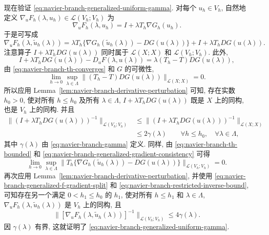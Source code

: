 \begin{Proof}
现在验证 \eqref{eq:navier-branch-generalized-uniform-gamma}.
对每个 $u_h\in V_h$, 自然地定义
$\nabla_uF_h(\lambda,u_h)\in\mathcal L(V_h;V_h)$ 为
\begin{equation}\label{eq:navier-branch-generalized-f-gradient}
\nabla_uF_h(\lambda,u_h)=I+\lambda T_h\nabla G_h(u_h).
\end{equation}
于是可写成
\begin{equation}\label{eq:navier-branch-generalized-f-gradient-split}
\nabla_uF_h(\lambda,\widetilde u_h(\lambda))
=\lambda T_h\{\nabla G_h(\widetilde u_h(\lambda))-DG(u(\lambda))\}
+I+\lambda T_hDG(u(\lambda)).
\end{equation}
注意算子 $I+\lambda T_hDG(u(\lambda))$ 同时属于
$\mathcal L(X;X)$ 和 $\mathcal L(V_h;V_h)$. 此外,
\[
I+\lambda T_hDG(u(\lambda))-D_uF(\lambda,u(\lambda))
=\lambda(T_h-T)DG(u(\lambda)),
\]
由 \eqref{eq:navier-branch-th-converges} 和 $G$ 的可微性,
\[
\lim_{h\to0}\sup_{\lambda\in\Lambda}
\|(T_h-T)DG(u(\lambda))\|_{\mathcal L(X;X)}=0.
\]
所以应用 Lemma~\ref{lem:navier-branch-derivative-perturbation} 可知,
存在实数 $h_0>0$, 使对所有 $h\leq h_0$ 及所有 $\lambda\in\Lambda$,
$I+\lambda T_hDG(u(\lambda))$ 既是 $X$ 上的同构, 也是 $V_h$ 上的同构. 并且
\begin{equation}\label{eq:navier-branch-restricted-inverse-bound}
\begin{aligned}
\|(I+\lambda T_hDG(u(\lambda)))^{-1}\|_{\mathcal L(V_h;V_h)}
&\leq
\|(I+\lambda T_hDG(u(\lambda)))^{-1}\|_{\mathcal L(X;X)}\\
&\leq2\gamma(\lambda)
\qquad\forall h\leq h_0,\quad\forall\lambda\in\Lambda,
\end{aligned}
\end{equation}
其中 $\gamma(\lambda)$ 由 \eqref{eq:navier-branch-gamma} 定义.
同样, 由 \eqref{eq:navier-branch-th-bounded} 和
\eqref{eq:navier-branch-generalized-gradient-consistency} 可得
\[
\lim_{h\to0}\sup_{\lambda\in\Lambda}
\|T_h\{\nabla G_h(\widetilde u_h(\lambda))-DG(u(\lambda))\}
\|_{\mathcal L(V_h;V_h)}=0.
\]
再次应用 Lemma~\ref{lem:navier-branch-derivative-perturbation}, 并使用
\eqref{eq:navier-branch-generalized-f-gradient-split} 和
\eqref{eq:navier-branch-restricted-inverse-bound}, 可知存在另一个满足
$0<h_1\leq h_0$ 的 $h_1$, 使对所有 $h\leq h_1$ 和
$\lambda\in\Lambda$, $\nabla_uF_h(\lambda,\widetilde u_h(\lambda))$
是 $V_h$ 上的同构, 且
\[
\|[\nabla_uF_h(\lambda,\widetilde u_h(\lambda))]^{-1}\|_{\mathcal L(V_h;V_h)}
\leq4\gamma(\lambda).
\]
因 $\gamma(\lambda)$ 有界, 这就证明了
\eqref{eq:navier-branch-generalized-uniform-gamma}.


\end{Proof}
